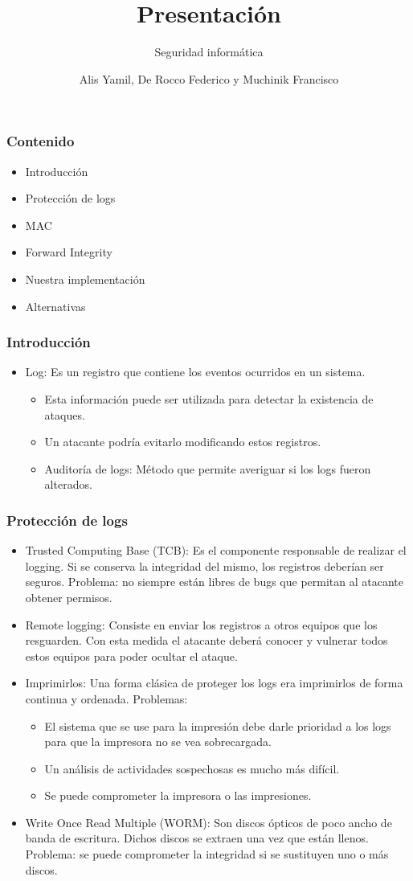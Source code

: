 \documentclass[10pt, a4paper,english,spanish]{beamer}
\title[Presentación]{Presentación}
\subtitle{Seguridad inform\'atica} %
\author{Alis Yamil, De Rocco Federico y Muchinik Francisco}
\institute{UBA} %
\begin{document}
\begin{frame}
\titlepage
\end{frame}

\begin{frame}
\frametitle{Contenido}
\begin{itemize}
\item Introducción
\item Protección de logs
\item MAC
\item Forward Integrity
\item Nuestra implementación
\item Alternativas
\end{itemize}
\end{frame}

\begin{frame}
\frametitle{Introducción}
\begin{itemize}
\item Log: Es un registro que contiene los eventos ocurridos en un sistema.
\begin{itemize}
\item Esta información puede ser utilizada para detectar la existencia de ataques.
\item Un atacante podría evitarlo modificando estos registros.
\item Auditoría de logs: Método que permite averiguar si los logs fueron alterados.
\end{itemize}
\end{itemize}
\end{frame}

\begin{frame}
\frametitle{Protección de logs}
\begin{itemize}
\item Trusted Computing Base (TCB): Es el componente responsable de realizar el logging. Si se conserva la integridad del mismo,
los registros deberían ser seguros. Problema: no siempre están libres de bugs que permitan al atacante obtener
permisos.
\item Remote logging: Consiste en enviar los registros a otros equipos que los resguarden. Con esta medida
el atacante deberá conocer y vulnerar todos estos equipos para poder ocultar el ataque.
\item Imprimirlos: Una forma clásica de proteger los logs era imprimirlos de forma continua y ordenada.
Problemas:
\begin{itemize}
\item El sistema que se use para la impresión debe darle prioridad a los logs para que la impresora no se vea sobrecargada.
\item Un análisis de actividades sospechosas es mucho más difícil.
\item Se puede comprometer la impresora o las impresiones.
\end{itemize}
\item Write Once Read Multiple (WORM): Son discos ópticos de poco ancho de banda de escritura. Dichos discos
se extraen una vez que están llenos. Problema: se puede comprometer la integridad si se sustituyen uno o más discos.
\end{itemize}
\end{frame}
\end{document}
